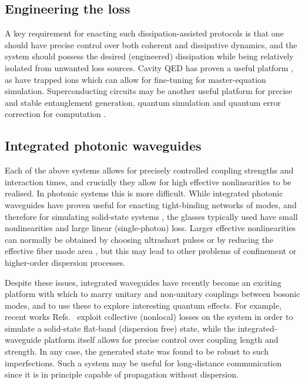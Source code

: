\subsection{Engineering the loss}

A key requirement for enacting such dissipation-assisted protocols is that one should have precise control over both coherent and dissipative dynamics, and the system should possess the desired (engineered) dissipation while being relatively isolated from unwanted loss sources. Cavity QED has proven a useful platform \cite{Clark2003}, as have trapped ions \cite{Barreiro2011, Poyatos1996} which can allow for fine-tuning for master-equation simulation. Superconducting circuits may be another useful platform for precise and stable entanglement generation, quantum simulation and quantum error correction for computation \cite{Kimchi-Schwartz2016, Kapit2017}.


\subsection{Integrated photonic waveguides}

Each of the above systems allows for precisely controlled coupling strengths and interaction times, and crucially they allow for high effective nonlinearities to be realised. In photonic systems this is more difficult. While integrated photonic waveguides have proven useful for enacting tight-binding networks of modes, and therefore for simulating solid-state systems \cite{Mukherjee2015, Vicencio2015}, the glasses typically used have small nonlinearities and large linear (single-photon) loss. Larger effective nonlinearities can normally be obtained by choosing ultrashort pulses or by reducing the effective fiber mode area \cite{Agrawal2007, Agrawal2001}, but this may lead to other problems of confinement or higher-order dispersion processes.

Despite these issues, integrated waveguides have recently become an exciting platform with which to marry unitary and non-unitary couplings between bosonic modes, and to use these to explore interesting quantum effects. For example, recent works Refs.~\cite{Mukherjee2015, Vicencio2015} exploit collective (nonlocal) losses on the system in order to simulate a solid-state flat-band (dispersion free) state, while the integrated-waveguide platform itself allows for precise control over coupling length and strength. In any case, the generated state was found to be robust to such imperfections. Such a system may be useful for long-distance communication since it is in principle capable of propagation without dispersion.

